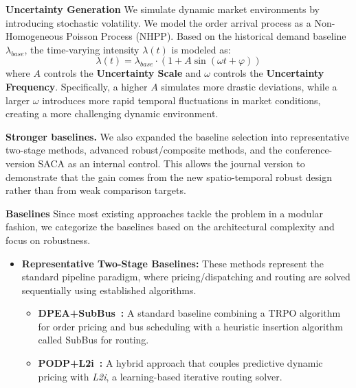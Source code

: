 \documentclass[11pt, a4paper]{article}
\begin{document}
\begin{itemize}
    \begin{boxedminipage}[htbp]{\linewidth}
    \vspace{2mm}
    \textbf{Uncertainty Generation}
    We simulate dynamic market environments by introducing stochastic volatility. We model the order arrival process as a Non-Homogeneous Poisson Process (NHPP). Based on the historical demand baseline $\lambda_{base}$, the time-varying intensity $\lambda(t)$ is modeled as:
    \begin{equation}
        \lambda(t) = \lambda_{base} \cdot (1 + A \sin(\omega t + \varphi))
    \end{equation}
    where $A$ controls the \textbf{Uncertainty Scale} and $\omega$ controls the \textbf{Uncertainty Frequency}. Specifically, a higher $A$ simulates more drastic deviations, while a larger $\omega$ introduces more rapid temporal fluctuations in market conditions, creating a more challenging dynamic environment.
    \end{boxedminipage}

    \textbf{Stronger baselines.} We also expanded the baseline selection into representative two-stage methods, advanced robust/composite methods, and the conference-version SACA as an internal control. This allows the journal version to demonstrate that the gain comes from the new spatio-temporal robust design rather than from weak comparison targets.
    
    \begin{boxedminipage}[htbp]{\linewidth}
    \vspace{2mm}
    \textbf{Baselines}
    Since most existing approaches tackle the problem in a modular fashion, we categorize the baselines based on the architectural complexity and focus on robustness.

    \begin{itemize}
        \item \textbf{Representative Two-Stage Baselines:} These methods represent the standard pipeline paradigm, where pricing/dispatching and routing are solved sequentially using established algorithms.
        \begin{itemize}
            \item \textbf{DPEA+SubBus~\cite{ref:DPEA, ref_shared_subway}:} A standard baseline combining a TRPO algorithm for order pricing and bus scheduling with a heuristic insertion algorithm called SubBus for routing.
            \item \textbf{PODP+L2i~\cite{ref:PODP, ref:L2i}:} A hybrid approach that couples predictive dynamic pricing with \textit{L2i}, a learning-based iterative routing solver.
        \end{itemize}
        

\end{itemize}
\end{boxedminipage}
\end{itemize}
\end{document}
